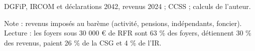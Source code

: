 DGFiP, IRCOM et déclarations 2042, revenus 2024 ; CCSS ; calculs de l'auteur.\par Note : revenus imposés au barème (activité, pensions, indépendants, foncier). Lecture : les foyers sous 30 000 \euro{} de RFR sont 63 \% des foyers, détiennent 30 \% des revenus, paient 26 \% de la CSG et 4 \% de l'IR.
